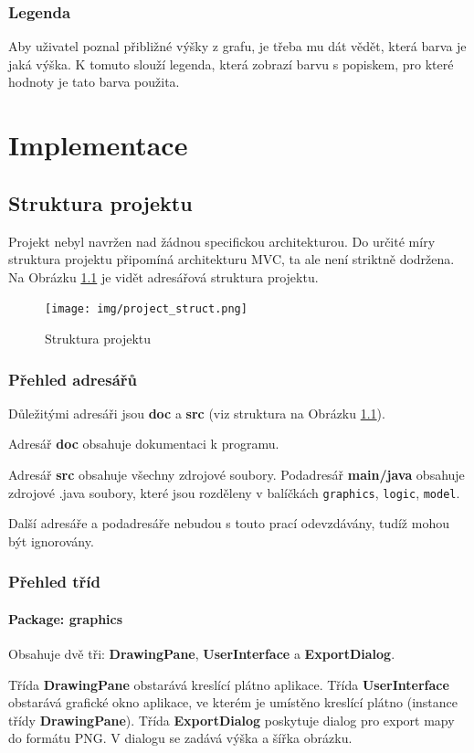 \documentclass[12pt]{report}
\begin{document}
\subsection{Legenda}
Aby uživatel poznal přibližné výšky z grafu, je třeba mu dát vědět, která barva je jaká výška. K tomuto
slouží legenda, která zobrazí barvu s popiskem, pro které hodnoty je tato barva použita.
%
\chapter{Implementace}
\section{Struktura projektu}
Projekt nebyl navržen nad žádnou specifickou architekturou. Do určité míry struktura projektu
připomíná architekturu MVC, ta ale není striktně dodržena. Na Obrázku \ref{img:project_struct}
je vidět adresářová struktura projektu.

\begin{figure}[H]
	\centering
	\texttt{[image: img/project\_struct.png]}
	\caption{Struktura projektu}
	\label{img:project_struct}
\end{figure}
%
\subsection{Přehled adresářů}
Důležitými adresáři jsou \textbf{doc} a \textbf{src} (viz struktura na Obrázku \ref{img:project_struct}).

Adresář \textbf{doc} obsahuje dokumentaci k programu.

Adresář \textbf{src} obsahuje všechny zdrojové soubory. Podadresář \textbf{main/java} obsahuje
zdrojové .java soubory, které jsou rozděleny v balíčkách \texttt{graphics}, \texttt{logic}, \texttt{model}.

Další adresáře a podadresáře nebudou s touto prací odevzdávány, tudíž mohou být ignorovány.
\subsection{Přehled tříd}
\subsubsection{Package: graphics}
Obsahuje dvě tři: \textbf{DrawingPane}, \textbf{UserInterface} a \textbf{ExportDialog}.

Třída \textbf{DrawingPane} obstarává kreslící plátno aplikace. 
Třída \textbf{UserInterface} obstarává grafické okno aplikace, ve kterém je umístěno kreslící plátno
(instance třídy \textbf{DrawingPane}).
Třída \textbf{ExportDialog} poskytuje dialog pro export mapy do formátu PNG. V dialogu se zadává
výška a šířka obrázku.
\end{document}

